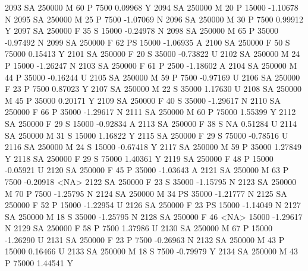 \documentclass{article}
\begin{document}
\begin{Schunk}
\begin{Soutput}
2093     SA     250000   M  60         P   7500   0.09968    Y
2094     SA     250000   M  20         P  15000  -1.10678    N
2095     SA     250000   M  25         P   7500  -1.07069    N
2096     SA     250000   M  30         P   7500   0.99912    Y
2097     SA     250000   F  35         S  15000  -0.24978    N
2098     SA     250000   M  65         P  35000  -0.97492    N
2099     SA     250000   F  62        PS  15000  -1.06935    A
2100     SA     250000   F  50         S  75000   0.15413    Y
2101     SA     250000   F  20         S  35000  -0.73822    U
2102     SA     250000   M  24         P  15000  -1.26247    N
2103     SA     250000   F  61         P   2500  -1.18602    A
2104     SA     250000   M  44         P  35000  -0.16244    U
2105     SA     250000   M  59         P   7500  -0.97169    U
2106     SA     250000   F  23         P   7500   0.87023    Y
2107     SA     250000   M  22         S  35000   1.17630    U
2108     SA     250000   M  45         P  35000   0.20171    Y
2109     SA     250000   F  40         S  35000  -1.29617    N
2110     SA     250000   F  66         P  35000  -1.29617    N
2111     SA     250000   M  60         P  75000   1.55399    Y
2112     SA     250000   F  29         S  15000  -0.92834    A
2113     SA     250000   F  38         S     NA   0.51284    U
2114     SA     250000   M  31         S  15000   1.16822    Y
2115     SA     250000   F  29         S  75000  -0.78516    U
2116     SA     250000   M  24         S  15000  -0.67418    Y
2117     SA     250000   M  59         P  35000   1.27849    Y
2118     SA     250000   F  29         S  75000   1.40361    Y
2119     SA     250000   F  48         P  15000  -0.05921    U
2120     SA     250000   F  45         P  35000  -1.03643    A
2121     SA     250000   M  63         P   7500  -0.20918 <NA>
2122     SA     250000   F  23         S  35000  -1.15795    N
2123     SA     250000   M  70         P   7500  -1.25795    N
2124     SA     250000   M  34        PS  35000  -1.21777    N
2125     SA     250000   F  52         P  15000  -1.22954    U
2126     SA     250000   F  23        PS  15000  -1.14049    N
2127     SA     250000   M  18         S  35000  -1.25795    N
2128     SA     250000   F  46      <NA>  15000  -1.29617    N
2129     SA     250000   F  58         P   7500   1.37986    U
2130     SA     250000   M  67         P  15000  -1.26290    U
2131     SA     250000   F  23         P   7500  -0.26963    N
2132     SA     250000   M  43         P  15000   0.16466    U
2133     SA     250000   M  18         S   7500  -0.79979    Y
2134     SA     250000   M  43         P  75000   1.44541    Y

\end{Soutput}
\end{Schunk}
\end{document}
